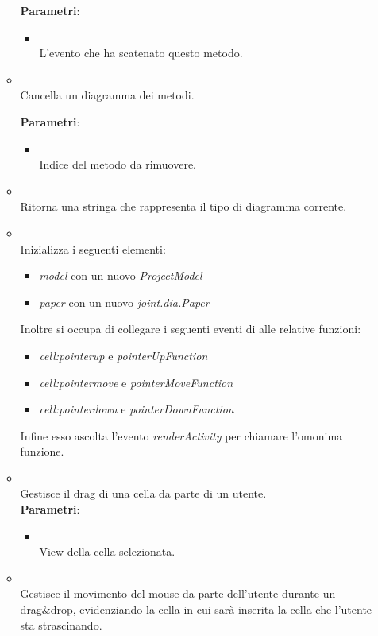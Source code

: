 \begin{itemize}
\begin{itemize}
\textbf{Parametri}:
\begin{itemize}
\item {}
\\ L'evento che ha scatenato questo metodo.
\end{itemize}
\item {}
\\ Cancella un diagramma dei metodi.	

\textbf{Parametri}:
\begin{itemize}
\item {}
\\ Indice del metodo da rimuovere.

\end{itemize}
\item {}
\\ Ritorna una stringa che rappresenta il tipo di diagramma corrente.	

\item {}
\\ Inizializza i seguenti elementi: \begin{itemize} \item \emph{model} con un nuovo \emph{ProjectModel} \item \emph{paper} con un nuovo \emph{joint.dia.Paper} \end{itemize} Inoltre si occupa di collegare i seguenti eventi di \jointjs{} alle relative funzioni: \begin{itemize} \item \emph{cell:pointerup} e \emph{pointerUpFunction} \item \emph{cell:pointermove} e \emph{pointerMoveFunction} \item \emph{cell:pointerdown} e \emph{pointerDownFunction} \end{itemize} Infine esso ascolta l'evento \emph{renderActivity} per chiamare l'omonima funzione.	

\item {}
\\ Gestisce il drag di una cella da parte di un utente.
\\ \textbf{Parametri}:
\begin{itemize}
\item {}
\\ View della cella selezionata.
\end{itemize}
\item {}
\\ Gestisce il movimento del mouse da parte dell'utente durante un drag\&drop, evidenziando la cella in cui sarà inserita la cella che l'utente sta strascinando.	


\end{itemize}
\end{itemize}
